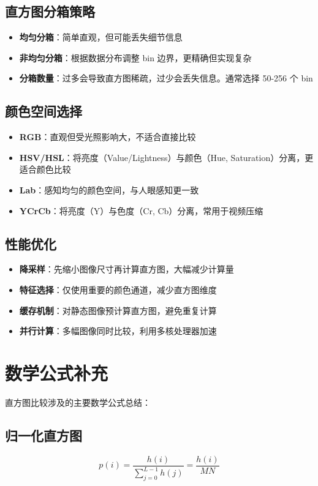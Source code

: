 \documentclass{article}
\begin{document}
\subsection{直方图分箱策略}
\begin{itemize}
    \item \textbf{均匀分箱}：简单直观，但可能丢失细节信息
    \item \textbf{非均匀分箱}：根据数据分布调整 bin 边界，更精确但实现复杂
    \item \textbf{分箱数量}：过多会导致直方图稀疏，过少会丢失信息。通常选择 50-256 个 bin
\end{itemize}

\subsection{颜色空间选择}
\begin{itemize}
    \item \textbf{RGB}：直观但受光照影响大，不适合直接比较
    \item \textbf{HSV/HSL}：将亮度（Value/Lightness）与颜色（Hue, Saturation）分离，更适合颜色比较
    \item \textbf{Lab}：感知均匀的颜色空间，与人眼感知更一致
    \item \textbf{YCrCb}：将亮度（Y）与色度（Cr, Cb）分离，常用于视频压缩
\end{itemize}

\subsection{性能优化}
\begin{itemize}
    \item \textbf{降采样}：先缩小图像尺寸再计算直方图，大幅减少计算量
    \item \textbf{特征选择}：仅使用重要的颜色通道，减少直方图维度
    \item \textbf{缓存机制}：对静态图像预计算直方图，避免重复计算
    \item \textbf{并行计算}：多幅图像同时比较，利用多核处理器加速
\end{itemize}

\section{数学公式补充}

直方图比较涉及的主要数学公式总结：

\subsection{归一化直方图}
\[
p(i) = \frac{h(i)}{\sum_{j=0}^{L-1} h(j)} = \frac{h(i)}{MN}
\]
\end{document}

